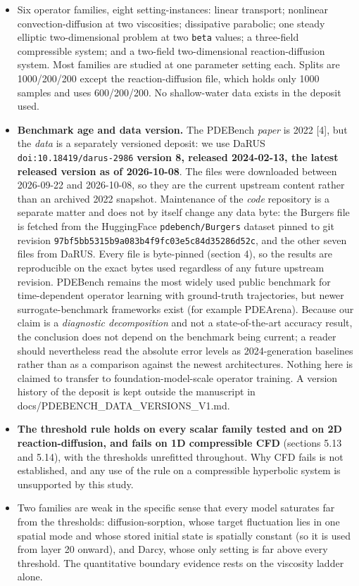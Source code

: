 \documentclass[preprint,12pt]{elsarticle}
\begin{document}
\begin{itemize}
\item Six operator families, eight setting-instances: linear transport; nonlinear convection-diffusion at two viscosities; dissipative parabolic; one steady elliptic two-dimensional problem at two \texttt{beta} values; a three-field compressible system; and a two-field two-dimensional reaction-diffusion system. Most families are studied at one parameter setting each. Splits are 1000/200/200 except the reaction-diffusion file, which holds only 1000 samples and uses 600/200/200. No shallow-water data exists in the deposit used.
\item \textbf{Benchmark age and data version.} The PDEBench \emph{paper} is 2022 [4], but the \emph{data} is a separately versioned deposit: we use DaRUS \texttt{doi:10.18419/darus-2986} \textbf{version 8, released 2024-02-13, the latest released version as of 2026-10-08}. The files were downloaded between 2026-09-22 and 2026-10-08, so they are the current upstream content rather than an archived 2022 snapshot. Maintenance of the \emph{code} repository is a separate matter and does not by itself change any data byte: the Burgers file is fetched from the HuggingFace \texttt{pdebench/Burgers} dataset pinned to git revision \texttt{97bf5bb5315b9a083b4f9fc03e5c84d35286d52c}, and the other seven files from DaRUS. Every file is byte-pinned (section 4), so the results are reproducible on the exact bytes used regardless of any future upstream revision. PDEBench remains the most widely used public benchmark for time-dependent operator learning with ground-truth trajectories, but newer surrogate-benchmark frameworks exist (for example PDEArena). Because our claim is a \emph{diagnostic decomposition} and not a state-of-the-art accuracy result, the conclusion does not depend on the benchmark being current; a reader should nevertheless read the absolute error levels as 2024-generation baselines rather than as a comparison against the newest architectures. Nothing here is claimed to transfer to foundation-model-scale operator training. A version history of the deposit is kept outside the manuscript in docs/PDEBENCH\_DATA\_VERSIONS\_V1.md.
\item \textbf{The threshold rule holds on every scalar family tested and on 2D reaction-diffusion, and fails on 1D compressible CFD} (sections 5.13 and 5.14), with the thresholds unrefitted throughout. Why CFD fails is not established, and any use of the rule on a compressible hyperbolic system is unsupported by this study.
\item Two families are weak in the specific sense that every model saturates far from the thresholds: diffusion-sorption, whose target fluctuation lies in one spatial mode and whose stored initial state is spatially constant (so it is used from layer 20 onward), and Darcy, whose only setting is far above every threshold. The quantitative boundary evidence rests on the viscosity ladder alone.

\end{itemize}
\end{document}
